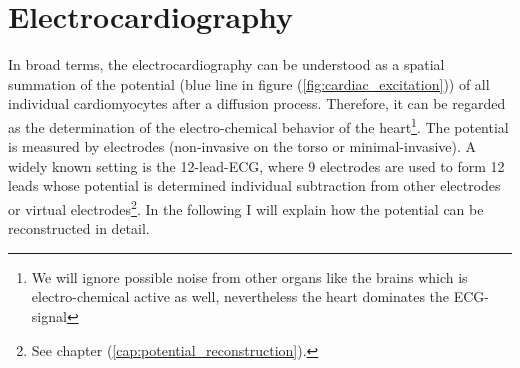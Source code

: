 




%

\section{Electrocardiography}
In broad terms, the electrocardiography can be understood as a spatial summation of the potential (blue line in figure (\ref{fig:cardiac_excitation})) of all individual cardiomyocytes after a diffusion process. Therefore, it can be regarded as the determination of the electro-chemical behavior of the heart\footnote{We will ignore possible noise from other organs like the brains which is electro-chemical active as well, nevertheless the heart dominates the ECG-signal}. The potential is measured by electrodes (non-invasive on the torso or minimal-invasive).
A widely known setting is the 12-lead-ECG, where 9 electrodes are used to form 12 leads whose potential is determined individual subtraction from other electrodes or virtual electrodes\footnote{See chapter (\ref{cap:potential_reconstruction}).}. In the following I will explain how the potential can be reconstructed in detail.
